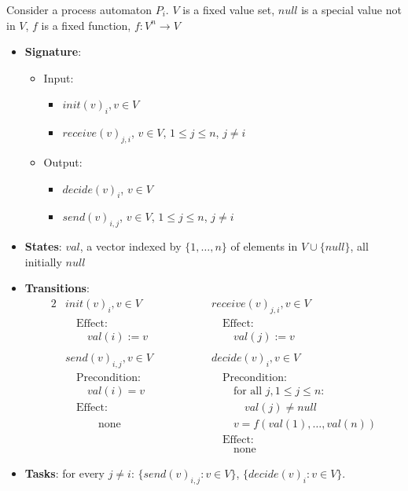 \documentclass[11pt]{article}
\begin{document}
\begin{examplle}
\label{8.1.2}

Consider a process automaton \(P_i\). \(V\) is a fixed value set, \(null\) is a special value not in \(V\), \(f\) is a fixed function,
\(f:V^n\to V\)
\begin{itemize}
\item \textbf{Signature}:
\begin{itemize}
\item Input:
\begin{itemize}
\item \(init(v)_i,v\in V\)
\item \(receive(v)_{j,i}\), \(v\in V\), \(1\le j\le n\), \(j\neq i\)
\end{itemize}
\item Output:
\begin{itemize}
\item \(decide(v)_i\), \(v\in V\)
\item \(send(v)_{i,j}\), \(v\in V\), \(1\le j\le n\), \(j\neq i\)
\end{itemize}
\end{itemize}
\item \textbf{States}: \(val\), a vector indexed by \(\{1,\dots,n\}\) of elements in \(V\cup\{null\}\), all
initially \(null\)
\item \textbf{Transitions}:
\begin{alignat*}{2}
&init(v)_i,v\in V\hspace{2cm}&&receive(v)_{j,i},v\in V\\
&\quad\text{Effect:}&&\quad\text{Effect:}\\
&\quad\quad val(i):=v&&\quad\quad val(j):=v\\\\
&send(v)_{i,j}, v\in V&&decide(v)_i,v\in V\\
&\quad\text{Precondition:}&&\quad\text{Precondition:}\\
&\quad\quad val(i)=v&&\quad\quad\text{for all }j, 1\le j\le n:\\
&\quad\text{Effect:}&&\quad\quad\quad val(j)\neq null\\
&\quad\quad\quad\text{none}&&\quad\quad v=f(val(1),\dots,val(n))\\
&&&\quad\text{Effect:}\\
&&&\quad\quad\text{none}
\end{alignat*}
\item \textbf{Tasks}: for every \(j\neq i\): \(\{send(v)_{i,j}:v\in V\}\), \(\{decide(v)_i:v\in V\}\).
\end{itemize}


\end{examplle}
\end{document}
